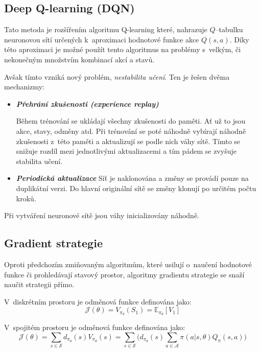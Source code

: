 \subsection{Deep Q-learning (DQN)}\label{subsec:deep-q-learning}

Tato metoda je rozšířením algoritmu Q-learning které,
nahrazuje $Q$--tabulku neuronovou sítí určených k~aproximaci hodnotové funkce akce $Q(s, a)$.
Díky této aproximaci je možné použít tento algoritmus na problémy s~velkým, či nekonečným množstvím kombinací akcí a stavů.

Avšak tímto vzniká nový problém, \emph{nestabilita učení}.
Ten je řešen dvěma mechanizmy:

\begin{itemize}
  \item \textbf{\emph{Přehrání zkušenosti (experience replay)}}
  
  Během trénování se ukládají všechny zkušenosti do paměti.
  Ať už to jsou akce, stavy, odměny atd.
  Při trénování se poté náhodně vybírají náhodně zkušenosti z~této paměti a aktualizují se podle nich váhy sítě.
  Tímto se snižuje rozdíl mezi jednotlivými aktualizacemi a tím pádem se zvyšuje stabilita učení.
  

  \item \textbf{\emph{Periodická aktualizace}}
  Síť je naklonována a změny se provádí pouze na duplikátní verzi.
  Do hlavní originální sítě se změny klonují po určitém počtu kroků.

\end{itemize}

Při vytváření neuronové sítě jsou váhy inicializovány náhodně.

\subsection{Gradient strategie}\label{subsec:gradient-strategie}
Oproti předchozím zmiňovaným algoritmům, které usilují o~naučení hodnotové funkce či prohledávají stavový prostor, algoritmy gradientu strategie se snaží naučit strategii přímo.

V~diskrétním prostoru je odměnová funkce definována jako:
\begin{equation}
  \label{eq:odmenova_funkce}
  \mathcal{J}(\theta) = V_{\pi_\theta}(S_1) = \mathbb{E}_{\pi_\theta}[V_1]
\end{equation}

V~spojitém prostoru je odměnová funkce definována jako:
\begin{equation}
    \label{eq:odmenova_funkce_spojita}
  \mathcal{J}(\theta) = \sum_{s \in \mathcal{S}} d_{\pi_\theta}(s) V_{\pi_\theta}(s) = \sum_{s \in \mathcal{S}} \Big( d_{\pi_\theta}(s) \sum_{a \in \mathcal{A}} \pi(a \vert s, \theta) Q_\pi(s, a) \Big)
  \end{equation}

